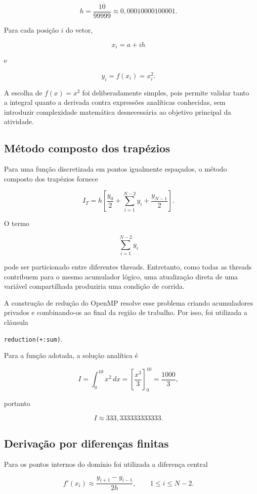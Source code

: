 \[
h=\frac{10}{99999}
\approx
0{,}00010000100001.
\]

Para cada posição $i$ do vetor,

\[
x_i=a+ih
\]

e

\[
y_i=f(x_i)=x_i^2.
\]

A escolha de $f(x)=x^2$ foi deliberadamente simples, pois permite validar tanto
a integral quanto a derivada contra expressões analíticas conhecidas, sem
introduzir complexidade matemática desnecessária ao objetivo principal da
atividade.


\subsection{Método composto dos trapézios}

Para uma função discretizada em pontos igualmente espaçados, o método
composto dos trapézios fornece

\[
I_T
=
h
\left[
\frac{y_0}{2}
+
\sum_{i=1}^{N-2} y_i
+
\frac{y_{N-1}}{2}
\right].
\]

O termo

\[
\sum_{i=1}^{N-2}y_i
\]

pode ser particionado entre diferentes threads. Entretanto, como todas as
threads contribuem para o mesmo acumulador lógico, uma atualização direta de
uma variável compartilhada produziria uma condição de corrida.

A construção de redução do OpenMP resolve esse problema criando acumuladores
privados e combinando-os ao final da região de trabalho. Por isso, foi
utilizada a cláusula

\begin{center}
\texttt{reduction(+:sum)}.
\end{center}

Para a função adotada, a solução analítica é

\[
I
=
\int_0^{10}x^2\,dx
=
\left[\frac{x^3}{3}\right]_0^{10}
=
\frac{1000}{3},
\]

portanto

\[
I
\approx
333{,}333333333333.
\]


\subsection{Derivação por diferenças finitas}

Para os pontos internos do domínio foi utilizada a diferença central

\[
f'(x_i)
\approx
\frac{y_{i+1}-y_{i-1}}{2h},
\qquad
1\leq i\leq N-2.
\]

